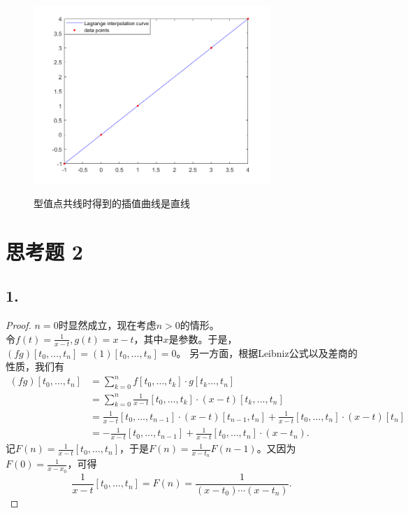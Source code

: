 \documentclass[utf8]{ctexart}
\begin{document}
\begin{figure}[H]
    \centering
    \includegraphics[width=0.8\textwidth]{lagrange_linear.png}
    \label{fig7}
    \caption{型值点共线时得到的插值曲线是直线}
\end{figure}

\section*{思考题 2}
\subsection*{1.}
\begin{proof}
    $n=0$时显然成立，现在考虑$n>0$的情形。\\
    令$f(t)=\frac{1}{x-t},g(t)=x-t$，其中$x$是参数。于是，$(fg)[t_0,\dots,t_n] = (1)[t_0,\dots,t_n]=0$。
    另一方面，根据Leibniz公式以及差商的性质，我们有
    \begin{equation*}
        \begin{aligned}
            (fg)[t_0,\dots,t_n] &= \sum_{k=0}^nf[t_0,\dots,t_k]\cdot g[t_k\dots,t_n]\\
            &= \sum_{k=0}^n\frac{1}{x-t}[t_0,\dots,t_k]\cdot (x-t)[t_k,\dots,t_n]\\
            &= \frac{1}{x-t}[t_0,\dots,t_{n-1}]\cdot (x-t)[t_{n-1},t_n] + \frac{1}{x-t}[t_0,\dots,t_{n}]\cdot (x-t)[t_n]\\
            &= -\frac{1}{x-t}[t_0,\dots,t_{n-1}] + \frac{1}{x-t}[t_0,\dots,t_{n}]\cdot(x-t_n).
        \end{aligned}
    \end{equation*}
    记$F(n) = \frac{1}{x-t}[t_0,\dots,t_{n}]$，于是$F(n) = \frac{1}{x-t_n}F(n-1)$。又因为$F(0)=\frac{1}{x-x_0}$，可得
$$
\frac{1}{x-t}[t_0,\dots,t_{n}] = F(n) = \frac{1}{(x-t_0)\cdots(x-t_n)}.
$$
\end{proof}
\end{document}
